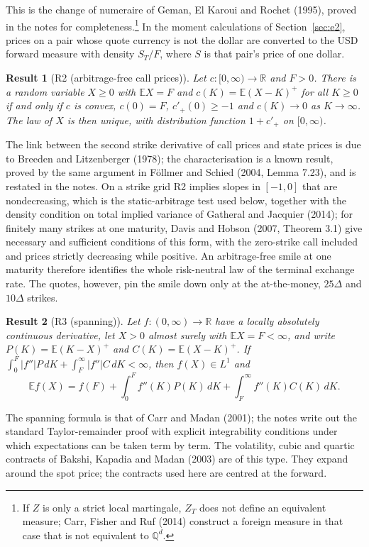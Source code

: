 \documentclass[11pt]{article}
\theoremstyle{result}
\newtheorem*{result}{Result}
\newcommand{\E}{\mathbb{E}}
\newcommand{\Q}{\mathbb{Q}}
\newcommand{\D}{\Delta}
\begin{document}
This is the change of numeraire of Geman, El Karoui and Rochet (1995), proved in the notes for completeness.\footnote{If $Z$ is only a strict local martingale, $Z_T$ does not define an equivalent measure; Carr, Fisher and Ruf (2014) construct a foreign measure in that case that is not equivalent to $\Q^d$.} In the moment calculations of Section~\ref{sec:e2}, prices on a pair whose quote currency is not the dollar are converted to the USD forward measure with density $S_T/F$, where $S$ is that pair's price of one dollar.

\begin{result}[R2 (arbitrage-free call prices)]
Let $c:[0,\infty)\to\mathbb R$ and $F>0$. There is a random variable $X\ge0$ with $\E X=F$ and $c(K)=\E(X-K)^+$ for all $K\ge0$ if and only if $c$ is convex, $c(0)=F$, $c'_+(0)\ge-1$ and $c(K)\to0$ as $K\to\infty$. The law of $X$ is then unique, with distribution function $1+c'_+$ on $[0,\infty)$.
\end{result}

The link between the second strike derivative of call prices and state prices is due to Breeden and Litzenberger (1978); the characterisation is a known result, proved by the same argument in F\"ollmer and Schied (2004, Lemma 7.23), and is restated in the notes. On a strike grid R2 implies slopes in $[-1,0]$ that are nondecreasing, which is the static-arbitrage test used below, together with the density condition on total implied variance of Gatheral and Jacquier (2014); for finitely many strikes at one maturity, Davis and Hobson (2007, Theorem 3.1) give necessary and sufficient conditions of this form, with the zero-strike call included and prices strictly decreasing while positive. An arbitrage-free smile at one maturity therefore identifies the whole risk-neutral law of the terminal exchange rate. The quotes, however, pin the smile down only at the at-the-money, $25\D$ and $10\D$ strikes.

\begin{result}[R3 (spanning)]
Let $f:(0,\infty)\to\mathbb R$ have a locally absolutely continuous derivative, let $X>0$ almost surely with $\E X=F<\infty$, and write $P(K)=\E(K-X)^+$ and $C(K)=\E(X-K)^+$. If $\int_0^F|f''|P\,dK+\int_F^\infty|f''|C\,dK<\infty$, then $f(X)\in L^1$ and
\[
\E f(X)=f(F)+\int_0^F f''(K)P(K)\,dK+\int_F^\infty f''(K)C(K)\,dK.
\]
\end{result}

The spanning formula is that of Carr and Madan (2001); the notes write out the standard Taylor-remainder proof with explicit integrability conditions under which expectations can be taken term by term. The volatility, cubic and quartic contracts of Bakshi, Kapadia and Madan (2003) are of this type. They expand around the spot price; the contracts used here are centred at the forward.
\end{document}
